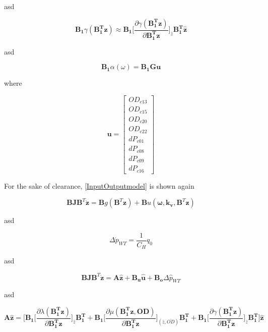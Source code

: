 asd

\begin{equation}
  \pmb{B_1} \gamma(\pmb{{B_1^{T}}}\pmb{z}) \approx \pmb{B_1} \bigg[ \frac{\partial{\gamma(\pmb{{B_1^{T}}}\pmb{z})}}{{\partial{\pmb{{B_1^{T}}}\pmb{z}}}}   \bigg]_{\bar{z}} \pmb{{B_1^{T}}}\pmb{\hat{z}}
\label{gamma_lin}
\end{equation}

asd

\begin{equation}
  \pmb{B_1} \alpha(\omega) = \pmb{B_1} \pmb{G} \pmb{u}
\label{gamma_lin}
\end{equation}

where 

\begin{equation}
\pmb{u} =
\begin{bmatrix} 
OD_{c13} \\
OD_{c15} \\
OD_{c20} \\
OD_{c22} \\
dP_{c01} \\
dP_{c08} \\
dP_{c09} \\
dP_{c16} 
\label{inputvector}
\end{bmatrix} 
\end{equation}



For the sake of clearance, \eqref{InputOutputmodel} is shown again  

\begin{equation}
 \pmb{B}\pmb{J {B}}^T \pmb{\dot{z}} = \pmb{B} g(\pmb{B}^T \pmb{z})+ \pmb{B} u(\pmb{\omega},\pmb{k_v	}, \pmb{B}^T \pmb{z})
 \label{InputOutputmodel}
\end{equation}

asd

\begin{equation}
\Delta \dot{p}_{WT} = \frac{1}{C_H} q_0
 \label{WT_eq}
\end{equation}

asd

\begin{equation}
 \pmb{B}\pmb{J {B}}^T \pmb{\dot{z}} = \pmb{A} \pmb{\hat{z}} + \pmb{B_u} \pmb{\hat{u}} + \pmb{B_o} \Delta \hat{p}_{WT}    
 \label{statespace_1}
\end{equation}

asd

\begin{equation}
  \pmb{A}\pmb{\hat{z}} = \bigg[\pmb{B_1} \bigg[ \frac{\partial{\lambda(\pmb{{B_1^{T}}}\pmb{z})}}{{\partial{\pmb{{B_1^{T}}}\pmb{z}}}}   \bigg]_{\bar{z}} \pmb{{B_1^{T}}} +  \pmb{B_1} \bigg[ \frac{\partial{\mu(\pmb{{B_1^{T}}}\pmb{z}, \pmb{OD})}}{{\partial{\pmb{{B_1^{T}}}\pmb{z}}}}  \bigg]_{(\bar{z}, \bar{OD})} \pmb{{B_1^{T}}} +  \pmb{B_1} \bigg[ \frac{\partial{\gamma(\pmb{{B_1^{T}}}\pmb{z})}}{{\partial{\pmb{{B_1^{T}}}\pmb{z}}}}   \bigg]_{\bar{z}} \pmb{{B_1^{T}}}\bigg] \pmb{\hat{z}} 
\label{Amatrix}
\end{equation}

